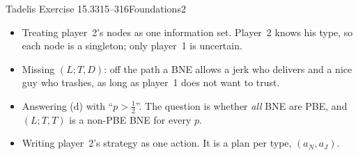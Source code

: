 \begin{exsol}{Tadelis Exercise 15.3}{315--316}{Foundations}{2}
\mistakes
\begin{itemize}
  \item Treating player~2's nodes as one information set. Player~2 knows his type, so each node is a
  singleton; only player~1 is uncertain.
  \item Missing $(L; T, D)$: off the path a BNE allows a jerk who delivers and a nice guy who trashes, as
  long as player~1 does not want to trust.
  \item Answering (d) with ``$p > \frac12$''. The question is whether \emph{all} BNE are PBE, and
  $(L; T, T)$ is a non-PBE BNE for every $p$.
  \item Writing player~2's strategy as one action. It is a plan per type, $(a_N, a_J)$.
\end{itemize}

\end{exsol}
